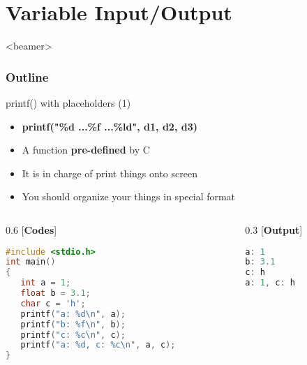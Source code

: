 \section{Variable Input/Output}
\label{sec:io}
\begin{frame}<beamer>
    \frametitle{Outline}
    \tableofcontents[currentsection]
\end{frame}

\begin{frame}[fragile]{printf() with placeholders (1)}
	\begin{itemize}
		\item {\textbf{printf("\%d ...\%f ...\%ld", d1, d2, d3)}}
		\item {A function \textbf{pre-defined} by C}
		\item {It is in charge of print things onto screen}
		\item {You should organize your things in special format}
	\end{itemize}
\begin{columns}	
\begin{column}{0.6\linewidth}
    [\textbf{Codes}]
	\begin{lstlisting}[numbers=none, language=c]
#include <stdio.h>
int main()
{
   int a = 1;
   float b = 3.1;
   char c = 'h';
   printf("a: %d\n", a);
   printf("b: %f\n", b);
   printf("c: %c\n", c);
   printf("a: %d, c: %c\n", a, c);
}
\end{lstlisting}
\end{column}
\begin{column}{0.3\linewidth}
[\textbf{Output}]
\begin{lstlisting}[numbers=none, language=c]
a: 1
b: 3.1
c: h
a: 1, c: h
\end{lstlisting}
\end{column}
\end{columns}
\end{frame}

